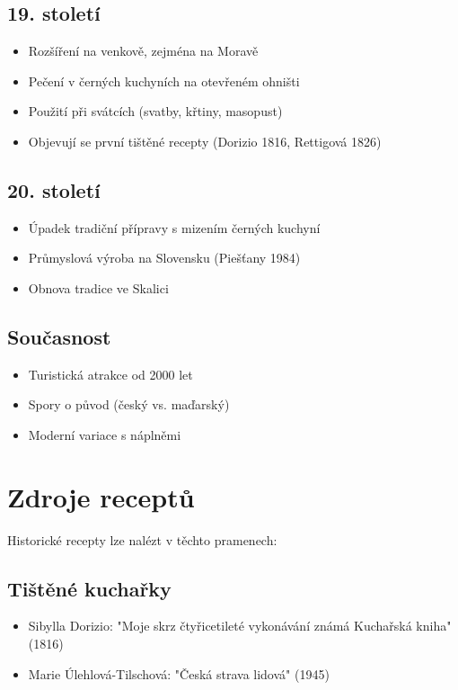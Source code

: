 \documentclass[a5paper,10pt]{book}
\begin{document}
\section{19. století}
\begin{itemize}
\item Rozšíření na venkově, zejména na Moravě
\item Pečení v černých kuchyních na otevřeném ohništi
\item Použití při svátcích (svatby, křtiny, masopust)
\item Objevují se první tištěné recepty (Dorizio 1816, Rettigová 1826)
\end{itemize}

\section{20. století}
\begin{itemize}
\item Úpadek tradiční přípravy s mizením černých kuchyní
\item Průmyslová výroba na Slovensku (Piešťany 1984)
\item Obnova tradice ve Skalici
\end{itemize}

\section{Současnost}
\begin{itemize}
\item Turistická atrakce od 2000 let
\item Spory o původ (český vs. maďarský)
\item Moderní variace s náplněmi
\end{itemize}

\chapter{Zdroje receptů}
Historické recepty lze nalézt v těchto pramenech:

\section{Tištěné kuchařky}
\begin{itemize}
\item Sibylla Dorizio: "Moje skrz čtyřicetileté vykonávání známá Kuchařská kniha" (1816)
\item Marie Úlehlová-Tilschová: "Česká strava lidová" (1945)
\end{itemize}
\end{document}
